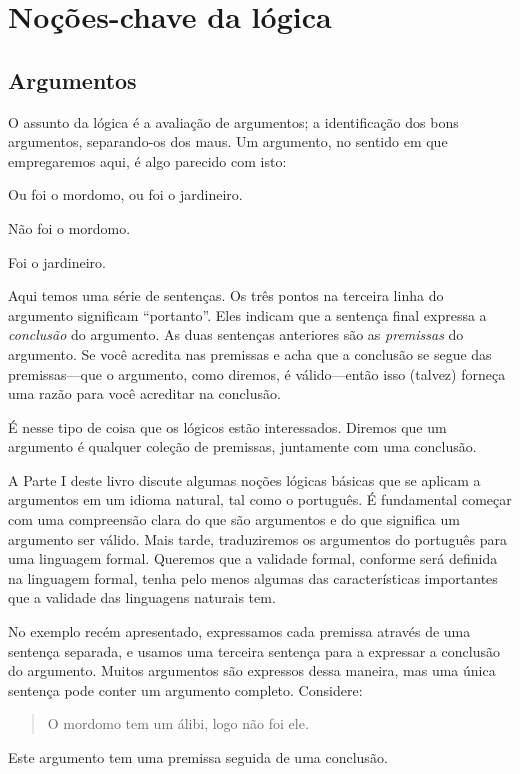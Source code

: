 \part{Noções-chave da lógica}
\label{ch.intro}


\chapter{Argumentos}
\label{s:Arguments}

O assunto da lógica é a avaliação de argumentos; a identificação dos bons argumentos, separando-os dos maus.  Um argumento, no sentido em que empregaremos aqui, é algo parecido com isto:

	\begin{earg}\label{argButlerGardner}
		\item[] Ou foi o mordomo, ou foi o jardineiro.
		\item[] Não foi o mordomo.
		\item[\therefore] Foi o jardineiro.
	\end{earg}
Aqui temos uma série de sentenças.
Os três pontos na terceira linha do argumento significam ``portanto''.
Eles indicam que a sentença final expressa a \emph{conclusão} do argumento.
As duas sentenças anteriores são as \emph{premissas} do argumento.
Se você acredita nas premissas e acha que a conclusão se segue das premissas---que o argumento, como diremos, é válido---então isso (talvez) forneça uma razão para você acreditar na conclusão.

É nesse tipo de coisa que os lógicos estão interessados. Diremos que um argumento é qualquer coleção de premissas, juntamente com uma conclusão.

A Parte I deste livro discute algumas noções lógicas básicas que se aplicam a argumentos em um idioma natural, tal como o português.
É fundamental começar com uma compreensão clara do que são argumentos e do que significa um argumento ser válido.
Mais tarde, traduziremos os argumentos do português para uma linguagem formal. Queremos que a validade formal, conforme será definida na linguagem formal, tenha pelo menos algumas das características importantes que a validade das linguagens naturais tem.

No exemplo recém apresentado, expressamos cada premissa através de uma sentença separada, e usamos uma terceira sentença para a expressar a conclusão do argumento.
Muitos argumentos são expressos dessa maneira, mas uma única sentença pode conter um argumento completo.
Considere:
	\begin{quote}
		O mordomo tem um álibi, logo não foi ele.
	\end{quote}
Este argumento tem uma premissa seguida de uma conclusão.

